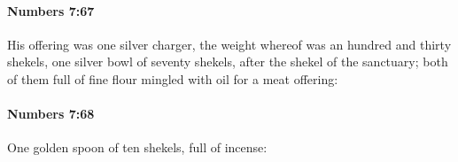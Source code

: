 		\paragraph{Numbers 7:67} %
			\label{NUMBERS-7-67}

			His offering was one silver charger, the weight whereof was an hundred and thirty shekels, one silver bowl of seventy shekels, after the shekel of the sanctuary; both of them full of fine flour mingled with oil for a meat offering:


		\paragraph{Numbers 7:68} %
			\label{NUMBERS-7-68}

			One golden spoon of ten shekels, full of incense:


